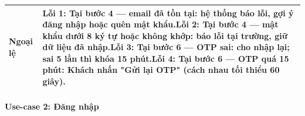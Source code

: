 \begin{longtable}{|p{3.2cm}|p{\dimexpr\linewidth-3.2cm-4\tabcolsep-3\arrayrulewidth\relax}|}
\textbf{Ngoại lệ} & \textbf{Lỗi 1:} Tại bước 4 --- email đã tồn tại: hệ thống báo lỗi, gợi ý đăng nhập hoặc quên mật khẩu.\newline \textbf{Lỗi 2:} Tại bước 4 --- mật khẩu dưới 8 ký tự hoặc không khớp: báo lỗi tại trường, giữ dữ liệu đã nhập.\newline \textbf{Lỗi 3:} Tại bước 6 --- OTP sai: cho nhập lại; sai 5 lần thì khóa 15 phút.\newline \textbf{Lỗi 4:} Tại bước 6 --- OTP quá 15 phút: Khách nhấn "Gửi lại OTP" (cách nhau tối thiểu 60 giây). \\ \hline
\end{longtable}
\endgroup


\paragraph{Use-case 2: Đăng nhập}

